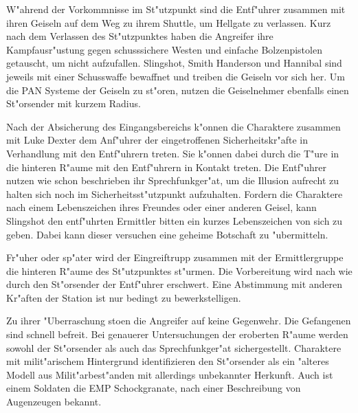 
W"ahrend der Vorkommnisse im St"utzpunkt sind die Entf"uhrer zusammen mit ihren Geiseln auf dem Weg zu ihrem Shuttle, um Hellgate zu verlassen. Kurz nach dem Verlassen des St"utzpunktes haben die Angreifer ihre Kampfausr"ustung gegen schusssichere Westen und einfache Bolzenpistolen getauscht, um nicht aufzufallen. Slingshot, Smith Handerson und Hannibal sind jeweils mit einer Schusswaffe bewaffnet und treiben die Geiseln vor sich her. Um die PAN Systeme der Geiseln zu st"oren, nutzen die Geiselnehmer ebenfalls einen St"orsender mit kurzem Radius.

Nach der Absicherung des Eingangsbereichs k"onnen die Charaktere zusammen mit Luke Dexter dem Anf"uhrer der eingetroffenen Sicherheitskr"afte in Verhandlung mit den Entf"uhrern treten. Sie k"onnen dabei durch die T"ure in die hinteren R"aume mit den Entf"uhrern in Kontakt treten. Die Entf"uhrer nutzen wie schon beschrieben ihr Sprechfunkger"at, um die Illusion aufrecht zu halten sich noch im Sicherheitsst"utzpunkt aufzuhalten. Fordern die Charaktere nach einem Lebenszeichen ihres Freundes oder einer anderen Geisel, kann Slingshot den entf"uhrten Ermittler bitten ein kurzes Lebenszeichen von sich zu geben. Dabei kann dieser versuchen eine geheime Botschaft zu "ubermitteln.

Fr"uher oder sp"ater wird der Eingreiftrupp zusammen mit der Ermittlergruppe die hinteren R"aume des St"utzpunktes st"urmen. Die Vorbereitung wird nach wie durch den St"orsender der Entf"uhrer erschwert. Eine Abstimmung mit anderen Kr"aften der Station ist nur bedingt zu bewerkstelligen. 

Zu ihrer "Uberraschung sto\3en die Angreifer auf keine Gegenwehr. Die Gefangenen sind schnell befreit. Bei genauerer Untersuchungen der eroberten R"aume werden sowohl der St"orsender als auch das Sprechfunkger"at sichergestellt. Charaktere mit milit"arischem Hintergrund identifizieren den St"orsender als ein "alteres Modell aus Milit"arbest"anden mit allerdings unbekannter Herkunft. Auch ist einem Soldaten die EMP Schockgranate, nach einer Beschreibung von Augenzeugen bekannt.
\vfill

